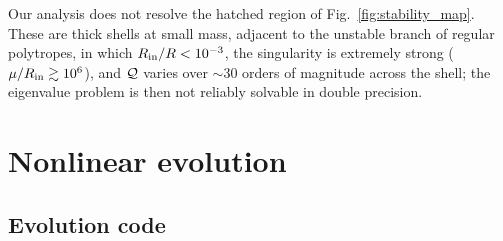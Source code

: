 \documentclass[%
 reprint,
 amsmath,amssymb,
 aps,prd,
 superscriptaddress,
]{revtex4-2}
\begin{document}
Our analysis does not resolve the hatched region of Fig.~\ref{fig:stability_map}. These are thick shells at small mass, adjacent to the unstable branch of regular polytropes, in which $R_{\rm in}/R<10^{-3}$, the singularity is extremely strong ($\mu/R_{\rm in}\gtrsim10^{6}$), and ${\cal Q}$ varies over $\sim30$ orders of magnitude across the shell; the eigenvalue problem is then not reliably solvable in double precision.

\section{Nonlinear evolution}
\label{sec:evolution}

\subsection{Evolution code}
\label{sec:ef}
\end{document}

